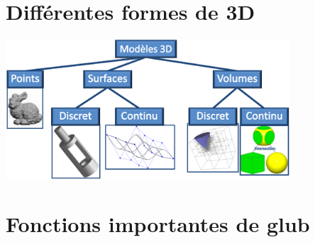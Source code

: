 \documentclass{report}
\begin{document}
\section{Différentes formes de 3D}
\includegraphics[width=400px]{./dif_3d.png}
\section{Fonctions importantes de glub}
\end{document}
